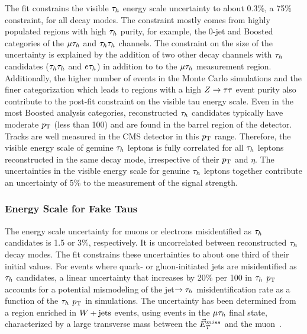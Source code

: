 The fit constrains the visible $\tau_{h}$ energy scale uncertainty to about 0.3\%, a 75\% constraint, for all 
decay modes. The constraint mostly comes from highly populated regions with high $\tau_{h}$ purity, for example,
the 0-jet and Boosted categories of the $\mu\tau_{h}$ and $\tau_{h}\tau_{h}$ channels. The constraint on the size of the 
uncertainty is explained by the addition of two other decay channels
with $\tau_{h}$ candidates ($\tau_{h}\tau_{h}$ and $e\tau_{h}$) in addition to to the $\mu\tau_{h}$ measurement region.
Additionally, the higher number of events in the Monte Carlo simulations and the finer categorization which 
leads to regions with a high $Z\to\tau\tau$ event purity also contribute to the post-fit constraint on the
visible tau energy scale.
Even in the most Boosted analysis categories, reconstructed $\tau_{h}$ candidates typically have moderate 
$p_\mathrm{T}$ (less than 100\GeV) and are
found in the barrel region of the detector. Tracks are well measured in the CMS detector in this $p_\mathrm{T}$ range.
Therefore, the visible energy scale of genuine $\tau_{h}$ leptons is fully correlated for all $\tau_{h}$ leptons 
reconstructed in the same decay mode, irrespective of their $p_\mathrm{T}$ and $\eta$. The uncertainties in the 
visible energy scale for genuine $\tau_{h}$ leptons together contribute an uncertainty of 5\% to the measurement 
of the signal strength.


\subsubsection{Energy Scale for Fake Taus}
The energy scale uncertainty for muons or electrons
misidentified as $\tau_{h}$ candidates is 1.5 or 3\%, respectively. It is uncorrelated between reconstructed $\tau_{h}$ decay
modes. The fit constrains these uncertainties to about one third of their initial values. For events where quark- or 
gluon-initiated jets are misidentified as $\tau_{h}$ candidates, a linear uncertainty that increases by 20\% per 100\GeV 
in $\tau_{h}$ $p_\mathrm{T}$ accounts for a potential mismodeling of the jet$\to\tau_{h}$ misidentification rate as a
function of the $\tau_{h}$ $p_\mathrm{T}$ in simulations. The uncertainty has been determined from a region enriched in $W+\text{jets}$ 
events, using events in the $\mu\tau_{h}$ final state, characterized by a large transverse mass 
between the $\vec{E}^{miss}_T$ and the muon~\cite{Khachatryan:2015dfa,CMS-PAS-TAU-16-002}.

